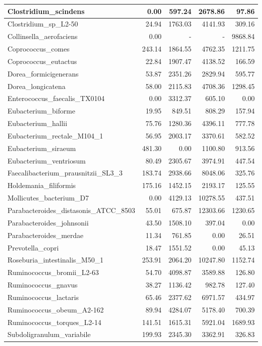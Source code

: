 \documentclass[12pt,a4paper]{article}
\begin{document}
\begin{table}[ht]
\begin{center}
\begin{tabular}{|l*{4}{|r}|}
Clostridium\_scindens & 0.00 & 597.24 & 2678.86 & 97.86 \\ \hline
Clostridium\_sp\_L2-50 & 24.94 & 1763.03 & 4141.93 & 309.16 \\ \hline
Collinsella\_aerofaciens & 0.00 & - & - & 9868.84 \\ \hline
Coprococcus\_comes & 243.14 & 1864.55 & 4762.35 & 1211.75 \\ \hline
Coprococcus\_eutactus & 22.84 & 1907.47 & 4138.52 & 166.59 \\ \hline
Dorea\_formicigenerans & 53.87 & 2351.26 & 2829.94 & 595.77 \\ \hline
Dorea\_longicatena & 58.00 & 2115.83 & 4708.36 & 1298.45 \\ \hline
Enterococcus\_faecalis\_TX0104 & 0.00 & 3312.37 & 605.10 & 0.00 \\ \hline
Eubacterium\_biforme & 19.95 & 849.51 & 808.29 & 157.94 \\ \hline
Eubacterium\_hallii & 75.76 & 1280.36 & 4396.11 & 777.78 \\ \hline
Eubacterium\_rectale\_M104\_1 & 56.95 & 2003.17 & 3370.61 & 582.52 \\ \hline
Eubacterium\_siraeum & 481.30 & 0.00 & 1100.80 & 913.56 \\ \hline
Eubacterium\_ventriosum & 80.49 & 2305.67 & 3974.91 & 447.54 \\ \hline
Faecalibacterium\_prausnitzii\_SL3\_3 & 183.74 & 2938.66 & 8048.06 & 325.76 \\ \hline
Holdemania\_filiformis & 175.16 & 1452.15 & 2193.17 & 125.55 \\ \hline
Mollicutes\_bacterium\_D7 & 0.00 & 4129.13 & 10278.55 & 437.51 \\ \hline
Parabacteroides\_distasonis\_ATCC\_8503 & 55.01 & 675.87 & 12303.66 & 1230.65 \\ \hline
Parabacteroides\_johnsonii & 43.50 & 1508.10 & 397.04 & 0.00 \\ \hline
Parabacteroides\_merdae & 11.34 & 761.85 & 0.00 & 26.51 \\ \hline
Prevotella\_copri & 18.47 & 1551.52 & 0.00 & 45.13 \\ \hline
Roseburia\_intestinalis\_M50\_1 & 253.91 & 2064.20 & 10247.80 & 1152.74 \\ \hline
Ruminococcus\_bromii\_L2-63 & 54.70 & 4098.87 & 3589.88 & 126.80 \\ \hline
Ruminococcus\_gnavus & 38.27 & 1136.42 & 982.78 & 127.40 \\ \hline
Ruminococcus\_lactaris & 65.46 & 2377.62 & 6971.57 & 434.97 \\ \hline
Ruminococcus\_obeum\_A2-162 & 89.94 & 4284.07 & 5178.40 & 700.39 \\ \hline
Ruminococcus\_torques\_L2-14 & 141.51 & 1615.31 & 5921.04 & 1689.93 \\ \hline
Subdoligranulum\_variabile & 199.93 & 2345.30 & 3362.91 & 326.83 \\ \hline
\end{tabular}
\end{center}
\end{table}
\end{document}
